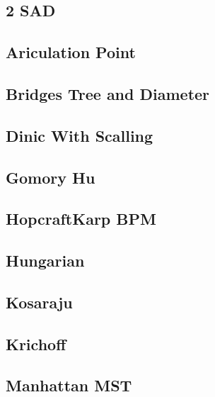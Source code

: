 \subsection{2 SAD}
\raggedbottom
\hrulefill
\subsection{Ariculation Point}
\raggedbottom
\hrulefill
\subsection{Bridges Tree and Diameter}
\raggedbottom
\hrulefill
\subsection{Dinic With Scalling}
\raggedbottom
\hrulefill
\subsection{Gomory Hu}
\raggedbottom
\hrulefill
\subsection{HopcraftKarp BPM}
\raggedbottom
\hrulefill
\subsection{Hungarian}
\raggedbottom
\hrulefill
\subsection{Kosaraju}
\raggedbottom
\hrulefill
\subsection{Krichoff}
\raggedbottom
\hrulefill
\subsection{Manhattan MST}
\raggedbottom
\hrulefill
